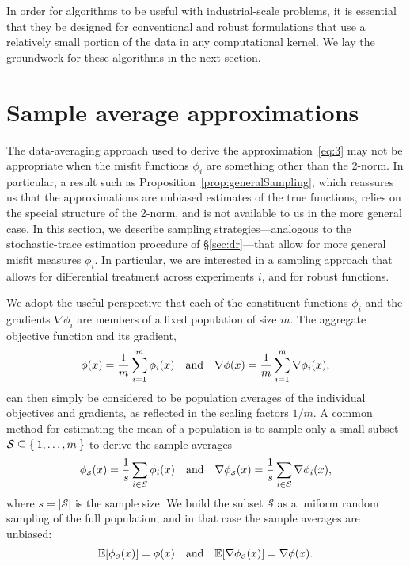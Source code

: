 \documentclass[nospthms]{svjour3}
\numberwithin{equation}{section}
\def\text #1{\hbox{\quad#1\quad}}
\def\Sscr{\mathcal{S}}
\def\expval{\mathbb{E}}
\def\sample{\Sscr}
\def\phis{\phi_{\scriptscriptstyle\sample}}
\begin{document}
In order for algorithms to be useful with industrial-scale problems,
it is essential that they be designed for conventional and robust
formulations that use a relatively small portion of the data in any
computational kernel.  We lay the groundwork for these algorithms in
the next section.


\section{Sample average approximations}
\label{sec:sampling}


The data-averaging approach used to derive the
approximation~\eqref{eq:3} may not be appropriate when the misfit
functions $\phi_i$ are something other than the 2-norm. In particular,
a result such as Proposition~\ref{prop:generalSampling}, which
reassures us that the approximations are unbiased estimates of the
true functions, relies on the special structure of the 2-norm, and is
not available to us in the more general case. In this section, we
describe sampling strategies---analogous to the stochastic-trace
estimation procedure of \S\ref{sec:dr}---that allow for more general
misfit measures $\phi_i$. In particular, we are interested in a
sampling approach that allows for differential treatment across
experiments $i$, and for robust functions.

We adopt the useful perspective that each of the constituent functions
$\phi_i$ and the gradients $\nabla\phi_i$ are members of a fixed
population of size $m$. The aggregate objective function and its
gradient,
\[
 \phi(x) = \frac1m\sum_{i=1}^m\phi_i(x)
 \text{and}
 \nabla\phi(x) = \frac1m\sum_{i=1}^m \nabla\phi_i(x),
\]
can then simply be considered to be population averages of the
individual objectives and gradients, as reflected in the scaling factors
$1/m$.  A common method for estimating the mean of a population is
to sample only a small subset $\sample\subseteq\Set{1,\ldots,m}$ to
derive the sample averages
\begin{equation}\label{eq:sample-phi}
 \phis(x) = \frac1{s}\sum_{i\in\sample}\phi_i(x)
 \text{and}
 \nabla\phis(x) = \frac1{s}\sum_{i\in\sample}\nabla\phi_i(x),
\end{equation}
where $s=|\sample|$ is the sample size.  We build the subset $\sample$
as a uniform random sampling of the full population, and in that case
the sample averages are unbiased:
\begin{equation}\label{eq:g-sample-avg}
\expval[\phis(x)] = \phi(x) \text{and} \expval[\nabla\phis(x)] = \nabla\phi(x).
\end{equation}
\end{document}
